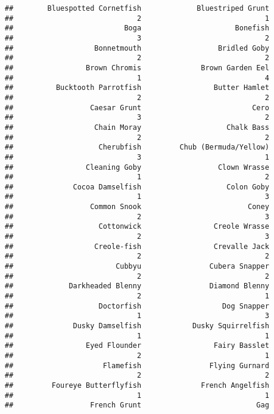 \documentclass[
]{article}
\begin{document}
\begin{verbatim}
##        Bluespotted Cornetfish             Bluestriped Grunt 
##                             2                             1 
##                          Boga                      Bonefish 
##                             3                             2 
##                   Bonnetmouth                  Bridled Goby 
##                             2                             2 
##                 Brown Chromis              Brown Garden Eel 
##                             1                             4 
##          Bucktooth Parrotfish                 Butter Hamlet 
##                             2                             2 
##                  Caesar Grunt                          Cero 
##                             3                             2 
##                   Chain Moray                    Chalk Bass 
##                             2                             2 
##                    Cherubfish         Chub (Bermuda/Yellow) 
##                             3                             1 
##                 Cleaning Goby                  Clown Wrasse 
##                             1                             2 
##              Cocoa Damselfish                    Colon Goby 
##                             1                             3 
##                  Common Snook                         Coney 
##                             2                             3 
##                    Cottonwick                 Creole Wrasse 
##                             2                             3 
##                   Creole-fish                 Crevalle Jack 
##                             2                             2 
##                        Cubbyu                Cubera Snapper 
##                             2                             2 
##             Darkheaded Blenny                Diamond Blenny 
##                             2                             1 
##                    Doctorfish                   Dog Snapper 
##                             1                             3 
##              Dusky Damselfish            Dusky Squirrelfish 
##                             1                             1 
##                 Eyed Flounder                 Fairy Basslet 
##                             2                             1 
##                     Flamefish                Flying Gurnard 
##                             2                             2 
##         Foureye Butterflyfish              French Angelfish 
##                             1                             1 
##                  French Grunt                           Gag 

\end{verbatim}
\end{document}
